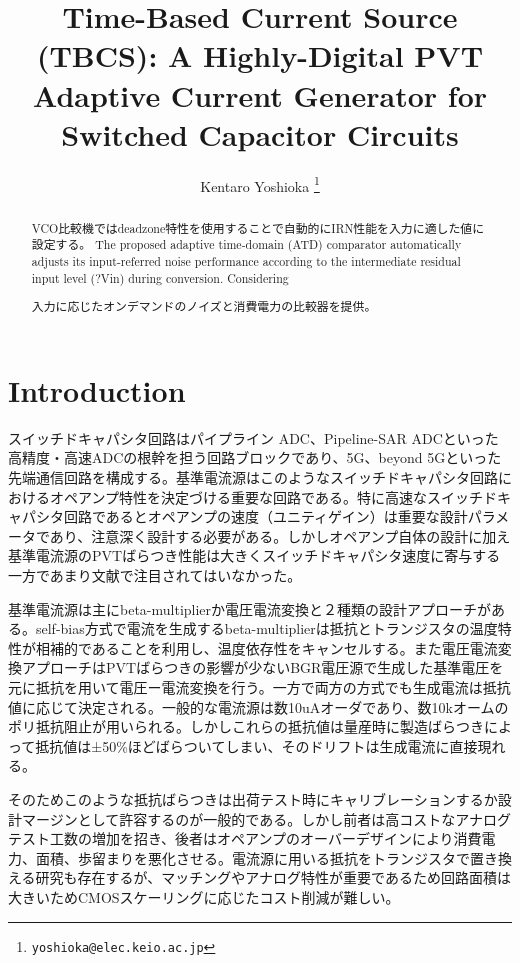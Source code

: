 \documentclass[letterpaper, 10 pt, conference]{ieeeconf}  %
\title{\LARGE \bf
Time-Based Current Source (TBCS): A Highly-Digital PVT Adaptive Current Generator for Switched Capacitor Circuits
}
\author{Kentaro Yoshioka%
\thanks{
        {\tt\small yoshioka@elec.keio.ac.jp}}
}
\begin{document}
\maketitle
\thispagestyle{empty}
\pagestyle{empty}

\begin{abstract}
VCO比較機ではdeadzone特性を使用することで自動的にIRN性能を入力に適した値に設定する。
The proposed adaptive time-domain (ATD) comparator automatically adjusts its input-referred noise performance according to the intermediate residual input level (?Vin) during conversion. Considering

入力に応じたオンデマンドのノイズと消費電力の比較器を提供。


\end{abstract}

\section{Introduction}
スイッチドキャパシタ回路はパイプライン ADC、Pipeline-SAR ADCといった高精度・高速ADCの根幹を担う回路ブロックであり、5G、beyond 5Gといった先端通信回路を構成する\cite{ali201414, ali202012, lagos2018single, hung2020calibration}。基準電流源はこのようなスイッチドキャパシタ回路におけるオペアンプ特性を決定づける重要な回路である。特に高速なスイッチドキャパシタ回路であるとオペアンプの速度（ユニティゲイン）は重要な設計パラメータであり、注意深く設計する必要がある。しかしオペアンプ自体の設計に加え基準電流源のPVTばらつき性能は大きくスイッチドキャパシタ速度に寄与する一方であまり文献で注目されてはいなかった。

基準電流源は主にbeta-multiplierか電圧電流変換と２種類の設計アプローチがある。self-bias方式で電流を生成するbeta-multiplierは抵抗とトランジスタの温度特性が相補的であることを利用し、温度依存性をキャンセルする\cite{azcona2014precision, osipov2016temperature}。また電圧電流変換アプローチはPVTばらつきの影響が少ないBGR電圧源で生成した基準電圧を元に抵抗を用いて電圧ー電流変換を行う\cite{banba1999cmos, ueno2009300}。一方で両方の方式でも生成電流は抵抗値に応じて決定される。一般的な電流源は数10uAオーダであり、数10kオームのポリ抵抗阻止が用いられる。しかしこれらの抵抗値は量産時に製造ばらつきによって抵抗値は±50\%ほどばらついてしまい、そのドリフトは生成電流に直接現れる。

そのためこのような抵抗ばらつきは出荷テスト時にキャリブレーションするか設計マージンとして許容するのが一般的である。しかし前者は高コストなアナログテスト工数の増加を招き、後者はオペアンプのオーバーデザインにより消費電力、面積、歩留まりを悪化させる。電流源に用いる抵抗をトランジスタで置き換える研究も存在するが\cite{hirose2010nano, osaki20131, choi201423pw}、マッチングやアナログ特性が重要であるため回路面積は大きいためCMOSスケーリングに応じたコスト削減が難しい。
\end{document}

